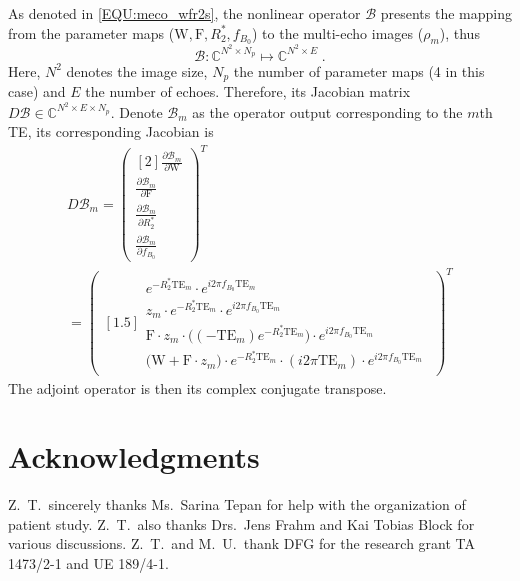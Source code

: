 \documentclass[journal,twoside,web]{ieeecolor}
\begin{document}
\begin{appendices}
As denoted in \cref{EQU:meco_wfr2s}, the nonlinear operator $\mathcal{B}$ presents the mapping 
from the parameter maps ($\text{W}, \text{F}, R_2^*, f_{B_0}$) 
to the multi-echo images ($\rho_m$), thus 
\begin{equation} \label{EQU:B_mapping}
\mathcal{B} : \mathbb{C}^{N^2 \times N_p} \mapsto \mathbb{C}^{N^2 \times E} \; .
\end{equation}
Here, $N^2$ denotes the image size, $N_p$ the number of parameter maps 
(4 in this case) and $E$ the number of echoes.
Therefore, its Jacobian matrix $D \mathcal{B} \in \mathbb{C}^{N^2 \times E \times N_p}$. 
Denote $\mathcal{B}_m$ as the operator output corresponding to the $m$th TE, 
its corresponding Jacobian is
\begin{multline*}
D\mathcal{B}_m = 
\begin{pmatrix}[2]
\frac{\partial \mathcal{B}_m}{\partial \text{W}} \\
\frac{\partial \mathcal{B}_m}{\partial \text{F}} \\
\frac{\partial \mathcal{B}_m}{\partial {R_2^*}} \\
\frac{\partial \mathcal{B}_m}{\partial f_{B_0}}
\end{pmatrix}^T \\ = 
\begin{pmatrix}[1.5]
\begin{array}{r}
e^{-{R_2^*} \text{TE}_m} \cdot e^{i2\pi f_{B_0} \text{TE}_m} \\
z_m \cdot e^{-{R_2^*} \text{TE}_m} \cdot e^{i2\pi f_{B_0} \text{TE}_m} \\
\text{F} \cdot z_m \cdot \Big( (-\text{TE}_m) e^{-{R_2^*} \text{TE}_m} \Big) \cdot e^{i2\pi f_{B_0} \text{TE}_m} \\
\Big( \text{W} + \text{F} \cdot z_m \Big) \cdot e^{-{R_2^*} \text{TE}_m} \cdot (i2\pi \text{TE}_m) \cdot e^{i2\pi f_{B_0} \text{TE}_m}
\end{array}
\end{pmatrix}^T
\end{multline*}
The adjoint operator is then its complex conjugate transpose.

\end{appendices}

\section*{Acknowledgments}

Z.~T.~sincerely thanks Ms.~Sarina Tepan 
for help with the organization of patient study. 
Z.~T.~also thanks Drs.~Jens Frahm and Kai Tobias Block 
for various discussions.
Z.~T.~and M.~U.~thank DFG for the research grant 
TA 1473/2-1 and UE 189/4-1. 





\end{document}
